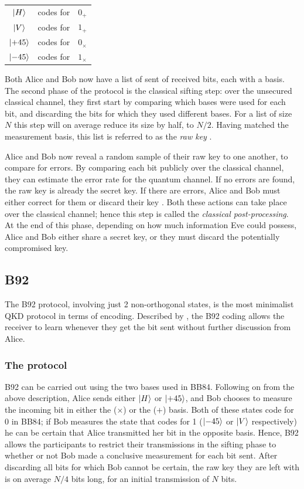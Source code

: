 \documentclass[paper=a4, fontsize=11pt]{scrartcl} %
\numberwithin{equation}{section} %
\numberwithin{figure}{section} %
\numberwithin{table}{section} %
\begin{document}
\begin{center}
\begin{tabular}{c c c}
	$\ket{H}$  & codes for & $0_+$ \\
	$\ket{V}$  & codes for & $1_+$ \\
	$\ket{+45}$  & codes for & $0_\times$ \\
	$\ket{-45}$  & codes for & $1_\times$ \\
\end{tabular}
\end{center}

Both Alice and Bob now have a list of sent of received bits, each with a basis. The second
phase of the protocol is the classical sifting step: over the unsecured classical channel, they
first start by comparing which bases were used for each bit, and discarding the bits for which
they used different bases. For a list of size $N$ this step will on average reduce its size by half,
to $N/2$. Having matched the measurement basis, this list is referred to as the \textit{raw key} \citep{gisin2002}.

Alice and Bob now reveal a random sample of their raw key to one another, to compare for errors. By
comparing each bit publicly over the classical channel, they can estimate the error rate for
the quantum channel. If no errors are found, the raw key is already the secret key. If there are
errors, Alice and Bob must either correct for them or discard their key \citep{reviewScariani}. Both these actions can
take place over the classical channel; hence this step is called the \textit{classical post-processing}.
At the end of this phase, depending on how much information Eve could possess, Alice and Bob either share
a secret key, or they must discard the potentially compromised key.

\subsection{B92}
The B92 protocol, involving just 2 non-orthogonal states, is the
most minimalist QKD protocol in terms of encoding. Described by \citet{B92},
the B92 coding allows the receiver to learn whenever they get
the bit sent without further discussion from Alice.

\subsubsection*{The protocol}
B92 can be carried out using the two bases used in BB84. Following on from the above description, Alice sends either
$\ket{H}$ or $\ket{+45}$, and Bob chooses to measure the incoming bit in either the ($\times$) or the ($+$)
basis. Both of these states code for 0 in BB84; if Bob measures the state that codes for 1 ($\ket{-45}$ or
$\ket{V}$ respectively) he can be certain that Alice transmitted her bit in the opposite basis. Hence, B92
allows the participants to restrict their transmissions in the sifting phase to whether or not Bob made
a conclusive measurement for each bit sent. After discarding all bits for which Bob cannot be certain, the raw
key they are left with is on average $N/4$ bits long, for an initial transmission of $N$ bits.
\end{document}
